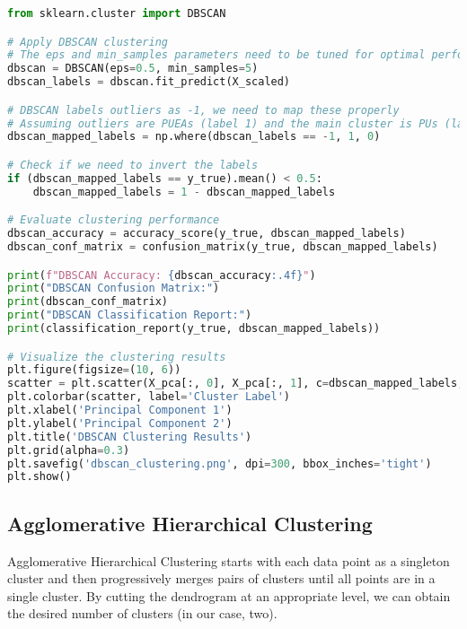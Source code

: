 \begin{lstlisting}[language=Python, caption=DBSCAN Clustering Code]
from sklearn.cluster import DBSCAN

# Apply DBSCAN clustering
# The eps and min_samples parameters need to be tuned for optimal performance
dbscan = DBSCAN(eps=0.5, min_samples=5)
dbscan_labels = dbscan.fit_predict(X_scaled)

# DBSCAN labels outliers as -1, we need to map these properly
# Assuming outliers are PUEAs (label 1) and the main cluster is PUs (label 0)
dbscan_mapped_labels = np.where(dbscan_labels == -1, 1, 0)

# Check if we need to invert the labels
if (dbscan_mapped_labels == y_true).mean() < 0.5:
    dbscan_mapped_labels = 1 - dbscan_mapped_labels

# Evaluate clustering performance
dbscan_accuracy = accuracy_score(y_true, dbscan_mapped_labels)
dbscan_conf_matrix = confusion_matrix(y_true, dbscan_mapped_labels)

print(f"DBSCAN Accuracy: {dbscan_accuracy:.4f}")
print("DBSCAN Confusion Matrix:")
print(dbscan_conf_matrix)
print("DBSCAN Classification Report:")
print(classification_report(y_true, dbscan_mapped_labels))

# Visualize the clustering results
plt.figure(figsize=(10, 6))
scatter = plt.scatter(X_pca[:, 0], X_pca[:, 1], c=dbscan_mapped_labels, alpha=0.6, cmap='viridis')
plt.colorbar(scatter, label='Cluster Label')
plt.xlabel('Principal Component 1')
plt.ylabel('Principal Component 2')
plt.title('DBSCAN Clustering Results')
plt.grid(alpha=0.3)
plt.savefig('dbscan_clustering.png', dpi=300, bbox_inches='tight')
plt.show()
\end{lstlisting}

\subsection{Agglomerative Hierarchical Clustering}
Agglomerative Hierarchical Clustering starts with each data point as a singleton cluster and then progressively merges pairs of clusters until all points are in a single cluster. By cutting the dendrogram at an appropriate level, we can obtain the desired number of clusters (in our case, two).

